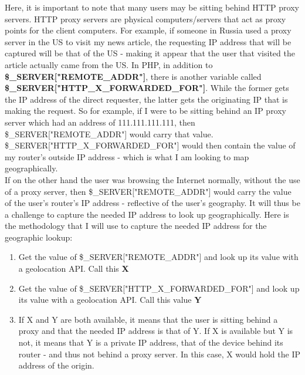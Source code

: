 \documentclass[12pt]{article}
\begin{document}
Here, it is important to note that many users may be sitting behind HTTP proxy servers. HTTP proxy servers are physical computers/servers that act as proxy points for the client computers. For example, if someone in Russia used a proxy server in the US to visit my news article, the requesting IP address that will be captured will be that of the US - making it appear that the user that visited the article actually came from the US. In PHP, in addition to \textbf{\$\_SERVER["REMOTE\_ADDR"]}, there is another variable called \textbf{\$\_SERVER["HTTP\_X\_FORWARDED\_FOR"]}. While the former gets the IP address of the direct requester, the latter gets the originating IP that is making the request. So for example, if I were to be sitting behind an IP proxy server which had an address of 111.111.111.111, then \$\_SERVER["REMOTE\_ADDR"] would carry that value. \\
\$\_SERVER["HTTP\_X\_FORWARDED\_FOR"] would then contain the value of my router's outside IP address - which is what I am looking to map geographically.   
\\ If on the other hand the user was browsing the Internet normally, without the use of a proxy server, then \$\_SERVER["REMOTE\_ADDR"] would carry the value of the user's router's IP address - reflective of the user's geography. 
It will thus be a challenge to capture the needed IP address to look up geographically. Here is the methodology that I will use to capture the needed IP address for the geographic lookup:
\begin{enumerate}
\item Get the value of \$\_SERVER["REMOTE\_ADDR"] and look up its value with a geolocation API. Call this \textbf{X}
\item Get the value of \$\_SERVER["HTTP\_X\_FORWARDED\_FOR"] and look up its value with a geolocation API. Call this value \textbf{Y}
\item If X and Y are both available, it means that the user is sitting behind a proxy and that the needed IP address is that of Y. If X is available but Y is not, it means that Y is a private IP address, that of the device behind its router - and thus not behind a proxy server. In this case, X would hold the IP address of the origin.
\end{enumerate} 

\vfill
\end{document}
